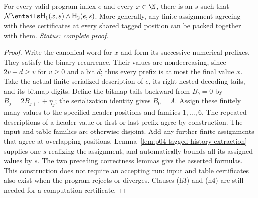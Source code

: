 \begin{lemma}
\label{lem:p04-input-table-packing}
For every valid program index \(e\) and every \(x\in\N\),
there is an \(s\) such that
\(\mathcal N\entails\mathsf H_1(\bar x,\bar s)
 \land\mathsf H_2(\bar e,\bar s)\).
More generally, any finite assignment agreeing with these certificates
at every shared tagged position can be packed together with them.
\textit{Status: complete proof.}
\end{lemma}

\begin{proof}
Write the canonical word for \(x\) and form its successive numerical
prefixes.  They satisfy the binary recurrence.  Their values are
nondecreasing, since \(2v+d\geq v\) for \(v\geq0\) and a bit
\(d\); thus every prefix is at most the final value \(x\).
Take the actual finite serialized description of \(e\), its right-nested
decoding tails, and its bitmap digits.  Define the bitmap tails backward
from \(B_b=0\) by \(B_j=2B_{j+1}+\eta_j\); the serialization
identity gives \(B_0=A\).  Assign these finitely many values to the
specified header positions and families \(1,\ldots,6\).
The repeated descriptions of a header value or first or last prefix
agree by construction.  The input and table families are otherwise
disjoint.  Add any further finite assignments that agree at overlapping
positions.  Lemma~\ref{lem:p04-tagged-history-extraction} supplies
one \(s\) realizing the assignment, and automatically bounds all its
assigned values by \(s\).  The two preceding correctness lemmas give
the asserted formulas.  This construction does not require an accepting
run: input and table certificates also exist when the program rejects
or diverges.  Clauses (h3) and (h4) are still needed for a computation
certificate.
\end{proof}

